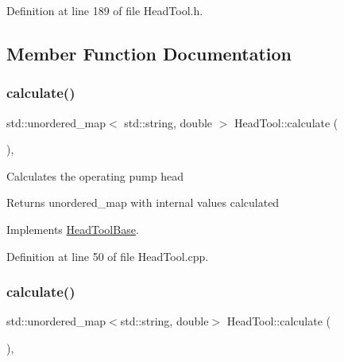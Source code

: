 Definition at line 189 of file Head\+Tool.\+h.



\subsection{Member Function Documentation}
\mbox{\label{class_head_tool_ab107e7717df4ca95404ce1952c21a84e}} 
\subsubsection{\texorpdfstring{calculate()}{calculate()}\hspace{0.1cm}{\footnotesize\ttfamily [1/3]}}
{\footnotesize\ttfamily std\+::unordered\+\_\+map$<$ std\+::string, double $>$ Head\+Tool\+::calculate (\begin{DoxyParamCaption}{ }\end{DoxyParamCaption})\hspace{0.3cm}{\ttfamily [override]}, {\ttfamily [virtual]}}

Calculates the operating pump head

\begin{DoxyReturn}{Returns}
unordered\+\_\+map with internal values calculated 
\end{DoxyReturn}


Implements \hyperlink{class_head_tool_base_ab8df8f908827ce45dc5e769ea0e10f0b}{Head\+Tool\+Base}.



Definition at line 50 of file Head\+Tool.\+cpp.

\mbox{\label{class_head_tool_a146eaf45d39cf6d691fa10b4b80b5e9e}} 
\subsubsection{\texorpdfstring{calculate()}{calculate()}\hspace{0.1cm}{\footnotesize\ttfamily [2/3]}}
{\footnotesize\ttfamily std\+::unordered\+\_\+map$<$std\+::string, double$>$ Head\+Tool\+::calculate (\begin{DoxyParamCaption}{ }\end{DoxyParamCaption})\hspace{0.3cm}{\ttfamily [override]}, {\ttfamily [virtual]}}

